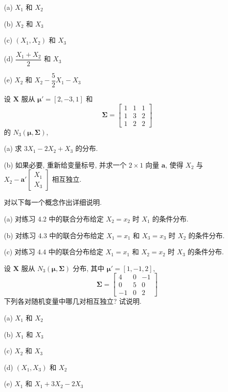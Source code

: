 
\noindent (a) $X_1$ 和 $X_2$

\noindent (b) $X_2$ 和 $X_3$

\noindent (c) $(X_1, X_2)$ 和 $X_3$

\noindent (d) $\dfrac{X_1 + X_2}{2}$ 和 $X_3$

\noindent (e) $X_2$ 和 $X_2 - \dfrac{5}{2}X_1 - X_3$

\quad 设 $\mathbf{X}$ 服从 $\boldsymbol{\mu}' = [2, -3, 1]$ 和
\[
\boldsymbol{\Sigma} = \begin{bmatrix} 1 & 1 & 1 \\ 1 & 3 & 2 \\ 1 & 2 & 2 \end{bmatrix}
\]
的 $N_3(\boldsymbol{\mu}, \boldsymbol{\Sigma})$,

\noindent (a) 求 $3X_1 - 2X_2 + X_3$ 的分布.

\noindent (b) 如果必要, 重新给变量标号, 并求一个 $2 \times 1$ 向量 $\mathbf{a}$, 使得 $X_2$ 与 $X_2 - \mathbf{a}'\begin{bmatrix} X_1 \\ X_3 \end{bmatrix}$ 相互独立.

\quad 对以下每一个概念作出详细说明.

\noindent (a) 对练习 4.2 中的联合分布给定 $X_2 = x_2$ 时 $X_1$ 的条件分布.

\noindent (b) 对练习 4.3 中的联合分布给定 $X_1 = x_1$ 和 $X_3 = x_3$ 时 $X_2$ 的条件分布.

\noindent (c) 对练习 4.4 中的联合分布给定 $X_1 = x_1$ 和 $X_2 = x_2$ 时 $X_3$ 的条件分布.

\quad 设 $\mathbf{X}$ 服从 $N_3(\boldsymbol{\mu}, \boldsymbol{\Sigma})$ 分布, 其中 $\boldsymbol{\mu}' = [1, -1, 2]$,
\[
\boldsymbol{\Sigma} = \begin{bmatrix} 4 & 0 & -1 \\ 0 & 5 & 0 \\ -1 & 0 & 2 \end{bmatrix}
\]
下列各对随机变量中哪几对相互独立? 试说明.

\noindent (a) $X_1$ 和 $X_2$

\noindent (b) $X_1$ 和 $X_3$

\noindent (c) $X_2$ 和 $X_3$

\noindent (d) $(X_1, X_3)$ 和 $X_2$

\noindent (e) $X_1$ 和 $X_1 + 3X_2 - 2X_3$


